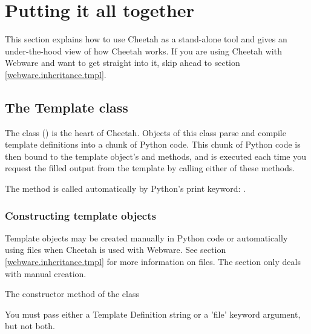 \section{Putting it all together}
\label{puttingItTogether}

This section explains how to use Cheetah as a stand-alone tool and gives an
under-the-hood view of how Cheetah works.  If you are using Cheetah with Webware
and want to get straight into it, skip ahead to section
\ref{webware.inheritance.tmpl}.

\subsection{The Template class}
\label{puttingItTogether.TO}
The  class () is the heart of
Cheetah.  Objects of this class parse and compile template definitions into a
chunk of Python code.  This chunk of Python code is then bound to the template
object's  and  methods, and is executed each
time you request the filled output from the template by calling either of these
methods.  

The  method is called automatically by Python's print keyword:
.


\subsubsection{Constructing template objects}

Template objects may be created manually in Python code or automatically using
 files when Cheetah is used with Webware. See section
\ref{webware.inheritance.tmpl} for more information on  files.  The
section only deals with manual creation.

The constructor method of the  class 

You must pass either a Template Definition string or a 'file' keyword argument,
but not both.  

